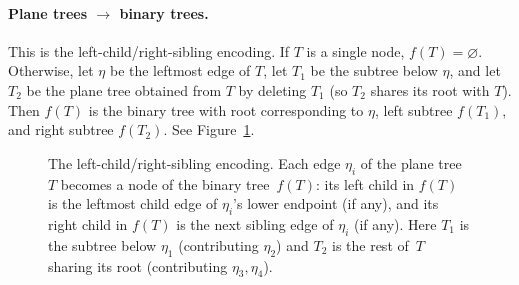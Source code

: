 \documentclass[a4paper,11pt]{article}
\theoremstyle{definition}
\begin{document}
\paragraph{Plane trees $\to$ binary trees.}
This is the left-child/right-sibling encoding. If $T$
is a single node, $f(T) = \varnothing$. Otherwise, let
$\eta$ be the leftmost edge of $T$, let $T_1$ be the
subtree below $\eta$, and let $T_2$ be the plane tree
obtained from $T$ by deleting $T_1$ (so $T_2$ shares
its root with $T$). Then $f(T)$ is the binary tree with
root corresponding to $\eta$, left subtree $f(T_1)$,
and right subtree $f(T_2)$. See
Figure~\ref{fig:lc-rs}.

\begin{figure}[ht]
\centering
{}
\caption{The left-child/right-sibling encoding. Each
edge $\eta_i$ of the plane tree~$T$ becomes a node of
the binary tree~$f(T)$: its left child in $f(T)$ is
the leftmost child edge of $\eta_i$'s lower endpoint
(if any), and its right child in $f(T)$ is the next
sibling edge of $\eta_i$ (if any). Here $T_1$ is the
subtree below $\eta_1$ (contributing $\eta_2$) and
$T_2$ is the rest of~$T$ sharing its root (contributing
$\eta_3, \eta_4$).}
\label{fig:lc-rs}
\end{figure}
\end{document}
